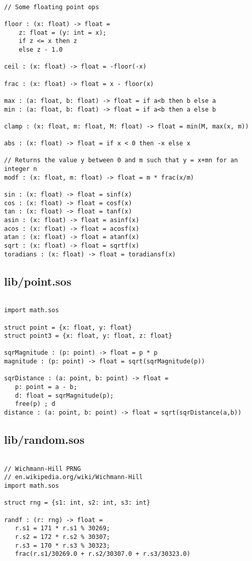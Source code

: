 \documentclass[main.tex]{subfiles}
\begin{document}
\begin{lstlisting}

// Some floating point ops

floor : (x: float) -> float = 
    z: float = (y: int = x);
    if z <= x then z
    else z - 1.0

ceil : (x: float) -> float = -floor(-x)

frac : (x: float) -> float = x - floor(x) 

max : (a: float, b: float) -> float = if a<b then b else a
min : (a: float, b: float) -> float = if a<b then a else b

clamp : (x: float, m: float, M: float) -> float = min(M, max(x, m))

abs : (x: float) -> float = if x < 0 then -x else x

// Returns the value y between 0 and m such that y = x+mn for an integer n
modf : (x: float, m: float) -> float = m * frac(x/m)

sin : (x: float) -> float = sinf(x)
cos : (x: float) -> float = cosf(x)
tan : (x: float) -> float = tanf(x)
asin : (x: float) -> float = asinf(x)
acos : (x: float) -> float = acosf(x)
atan : (x: float) -> float = atanf(x)
sqrt : (x: float) -> float = sqrtf(x)
toradians : (x: float) -> float = toradiansf(x)
\end{lstlisting}

\subsection{lib/point.sos}

\begin{lstlisting}

import math.sos

struct point = {x: float, y: float}
struct point3 = {x: float, y: float, z: float}

sqrMagnitude : (p: point) -> float = p * p
magnitude : (p: point) -> float = sqrt(sqrMagnitude(p))

sqrDistance : (a: point, b: point) -> float = 
   p: point = a - b;
   d: float = sqrMagnitude(p);
   free(p) ; d
distance : (a: point, b: point) -> float = sqrt(sqrDistance(a,b))
\end{lstlisting}

\subsection{lib/random.sos}

\begin{lstlisting}

// Wichmann-Hill PRNG
// en.wikipedia.org/wiki/Wichmann-Hill
import math.sos

struct rng = {s1: int, s2: int, s3: int}

randf : (r: rng) -> float =
   r.s1 = 171 * r.s1 % 30269;
   r.s2 = 172 * r.s2 % 30307;
   r.s3 = 170 * r.s3 % 30323;
   frac(r.s1/30269.0 + r.s2/30307.0 + r.s3/30323.0)
\end{lstlisting}
\end{document}
